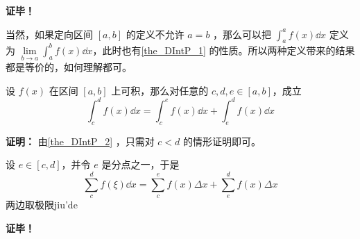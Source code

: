 \textbf{证毕！} 

当然，如果定向区间 $[a,b]$ 的定义不允许 $a=b$ ，那么可以把 $\int_a^a f(x)\dd x$ 定义为 $\lim\limits_{b\rightarrow a}\int_a^b f(x)\dd x$，此时也有\autoref{the_DIntP_1} 的性质。所以两种定义带来的结果都是等价的，如何理解都可。

\begin{theorem}{}
设 $f(x)$ 在区间 $[a,b]$ 上可积，那么对任意的 $c,d,e\in[a,b]$，成立
\begin{equation}
\int_c^d f(x)\dd x=\int_c^e f(x)\dd x+\int_e^d f(x)\dd x
\end{equation}
\end{theorem}
\textbf{证明：}
由\autoref{the_DIntP_2} ，只需对 $c<d$ 的情形证明即可。

设 $e\in [c,d]$，并令 $e$ 是分点之一，于是
\begin{equation}
\sum_{c}^d f(\xi)\dd x=\sum_c^e f(x)\Delta x+\sum_e^d f(x)\Delta x
\end{equation}
两边取极限jiu'de

\textbf{证毕！}